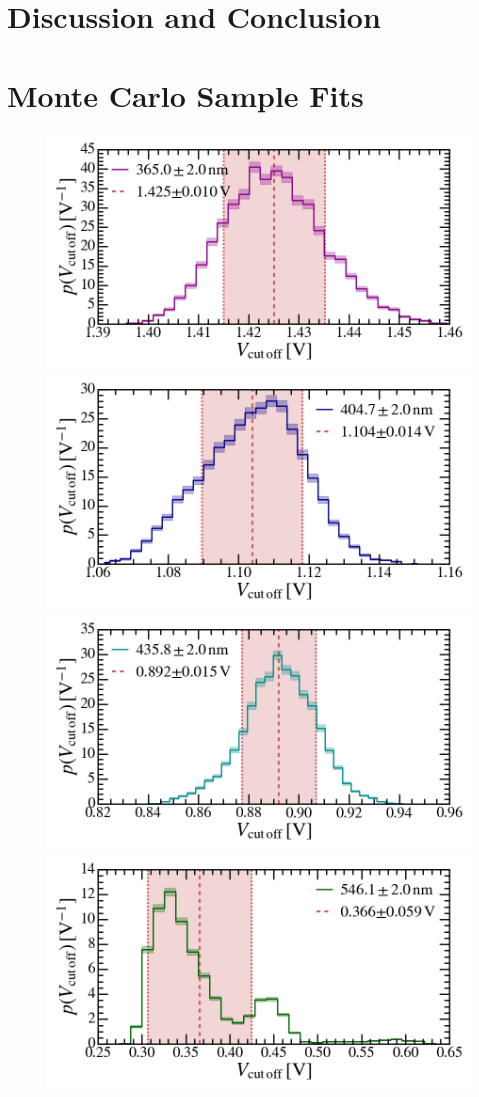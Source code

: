 \documentclass[aps,twocolumn,secnumarabic,balancelastpage,amsmath,amssymb,nofootinbib,floatfix]{revtex4-1}
\begin{document}
\section{Discussion and Conclusion}
\label{sec:conclusion}





\appendix

\section{Monte Carlo Sample Fits}

\begin{figure}
    \centering
    \includegraphics[width=0.49 \textwidth]{Figures/V_cutoff_365nm.png}
    \includegraphics[width=0.49 \textwidth]{Figures/V_cutoff_405nm.png}
    \includegraphics[width=0.49 \textwidth]{Figures/V_cutoff_436nm.png}
    \includegraphics[width=0.49 \textwidth]{Figures/V_cutoff_546nm.png}

\end{figure}
\end{document}
